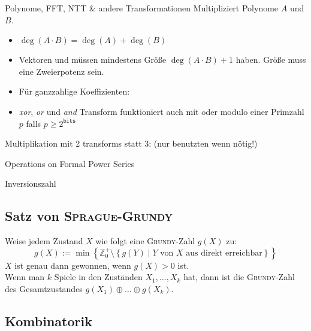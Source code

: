 \begin{algorithm}{Polynome, FFT, NTT \& andere Transformationen}
	Multipliziert Polynome $A$ und $B$.
	\begin{itemize}
		\item $\deg(A \cdot B) = \deg(A) + \deg(B)$
		\item Vektoren  und  müssen mindestens Größe
		$\deg(A \cdot B) + 1$ haben.
		Größe muss eine Zweierpotenz sein.
		\item Für ganzzahlige Koeffizienten: 
		\item \emph{xor}, \emph{or} und \emph{and} Transform funktioniert auch mit  oder modulo einer Primzahl $p$ falls $p \geq 2^{\texttt{bits}}$
	\end{itemize}
	Multiplikation mit 2 transforms statt 3: (nur benutzten wenn nötig!)
\end{algorithm}

\begin{algorithm}{Operations on Formal Power Series}
\end{algorithm}

\begin{algorithm}{Inversionszahl}
\end{algorithm}

\subsection{Satz von \textsc{Sprague-Grundy}}
Weise jedem Zustand $X$ wie folgt eine \textsc{Grundy}-Zahl $g\left(X\right)$ zu:
\[
g\left(X\right) := \min\left\{
\mathbb{Z}_0^+ \setminus
\left\{g\left(Y\right) \mid Y \text{ von } X \text{ aus direkt erreichbar}\right\}
\right\}
\]
$X$ ist genau dann gewonnen, wenn $g\left(X\right) > 0$ ist.\\
Wenn man $k$ Spiele in den Zuständen $X_1, \ldots, X_k$ hat, dann ist die \textsc{Grundy}-Zahl des Gesamtzustandes $g\left(X_1\right) \oplus \ldots \oplus g\left(X_k\right)$.

\subsection{Kombinatorik}

